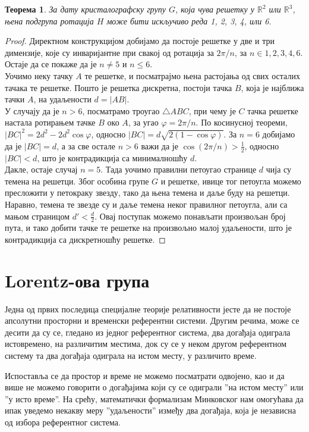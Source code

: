 \documentclass{report}
\theoremstyle{plain}
\newtheorem{thm}{Теорема}
\theoremstyle{definition}
\begin{document}
\begin{thm}
За дату кристалографску групу $G$, која чува решетку у $\mathbb{R}^2$ или $\mathbb{R}^3$, њена подгрупа ротација $H$ може бити искључиво реда 1, 2, 3, 4, или 6.
\end{thm}
\begin{proof}
Директном конструкцијом добијамо да постоје решетке у две и три димензије, које су инваријантне при свакој од ротација за $2\pi/n$, за $n\in{1, 2, 3, 4, 6}$. Остаје да се покаже да је $n\neq 5$ и $n\leq 6$.\\
Уочимо неку тачку $A$ те решетке, и посматрајмо њена растојања од свих осталих тачака те решетке. Пошто је решетка дискретна, постоји тачка $B$, која је најближа тачки $A$, на удаљености $d = |AB|$.\\
У случају да је $n>6$, посматрамо троугао $\triangle ABC$, при чему је $C$ тачка решетке настала ротирањем тачке $B$ око $A$, за угао $\varphi = 2\pi/n$. По косинусној теореми, $|BC|^2 = 2 d^2-2 d^2 \cos\varphi$, односно $|BC| = d\sqrt{2(1-\cos\varphi)}$. За $n=6$ добијамо да је $|BC| = d$, а за све остале $n>6$ важи да је $\cos(2\pi/n)>\frac12$, односно $|BC|<d$, што је контрадикција са минималношћу $d$.\\
Дакле, остаје случај $n=5$. Тада уочимо правилни петоугао странице $d$ чија су темена на решетци. Због особина групе $G$ и решетке, ивице тог петоугла можемо пресложити у петокраку звезду, тако да њена темена и даље буду на решетци. Наравно, темена те звезде су и даље темена неког правилног петоугла, али са мањом страницом $d'<\frac d 2$. Овај поступак можемо понављати произвољан број пута, и тако добити тачке те решетке на произвољно малој удаљености, што је контрадикција са дискретношћу решетке.
\end{proof}
\section{Lorentz-ова група}

Једна од првих последица специјалне теорије релативности јесте да не постоје апсолутни просторни и временски референтни системи. Другим речима, може се десити да су се, гледано из једног референтног система, два догађаја одиграла истовремено, на различитим местима, док су се у неком другом референтном систему та два догађаја одиграла на истом месту, у различито време.

Испоставља се да простор и време не можемо посматрати одвојено, као и да више не можемо говорити о догађајима који су се одиграли ''на истом месту'' или ''у исто време''. На срећу, математички формализам Минковског нам омогућава да ипак уведемо некакву меру ''удаљености'' између два догађаја, која је независна од избора референтног система.
\end{document}
